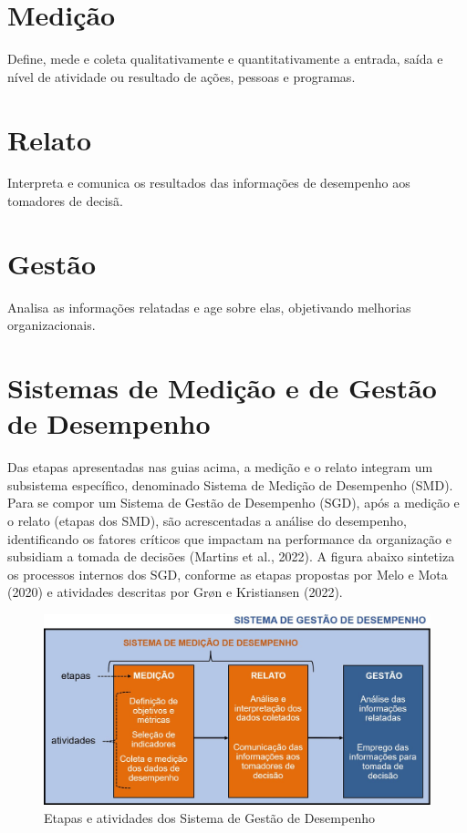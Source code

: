 \documentclass[
  letterpaper,
  DIV=11,
  numbers=noendperiod]{scrreprt}
\begin{document}
\section{Medição}

Define, mede e coleta qualitativamente e quantitativamente a entrada,
saída e nível de atividade ou resultado de ações, pessoas e programas.

\section{Relato}

Interpreta e comunica os resultados das informações de desempenho aos
tomadores de decisã.

\section{Gestão}

Analisa as informações relatadas e age sobre elas, objetivando melhorias
organizacionais.

\hypertarget{sistemas-de-mediuxe7uxe3o-e-de-gestuxe3o-de-desempenho-1}{%
\section{Sistemas de Medição e de Gestão de
Desempenho}\label{sistemas-de-mediuxe7uxe3o-e-de-gestuxe3o-de-desempenho-1}}

Das etapas apresentadas nas guias acima, a medição e o relato integram
um subsistema específico, denominado Sistema de Medição de Desempenho
(SMD). Para se compor um Sistema de Gestão de Desempenho (SGD), após a
medição e o relato (etapas dos SMD), são acrescentadas a análise do
desempenho, identificando os fatores críticos que impactam na
performance da organização e subsidiam a tomada de decisões (Martins et
al., 2022). A figura abaixo sintetiza os processos internos dos SGD,
conforme as etapas propostas por Melo e Mota (2020) e atividades
descritas por Grøn e Kristiansen (2022).

\begin{figure}

{\centering \includegraphics[width=10.52083in,height=\textheight]{images/SMD.JPG}

}

\caption{Etapas e atividades dos Sistema de Gestão de Desempenho}

\end{figure}
\end{document}
